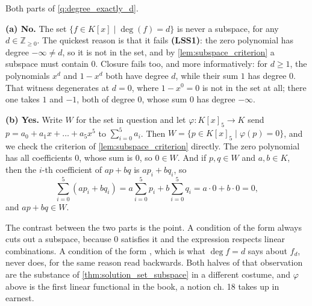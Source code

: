 \begin{answer}
Both parts of \cref{q:degree_exactly_d}.

\textbf{(a) No.} The set $\{f \in K[x] \mid \deg(f) = d\}$ is never a subspace, for any $d \in \mathbb{Z}_{\ge 0}$. The quickest reason is that it fails \textbf{(LSS1)}: the zero polynomial has degree $-\infty \neq d$, so it is not in the set, and by \cref{lem:subspace_criterion} a subspace must contain $0$. Closure fails too, and more informatively: for $d \ge 1$, the polynomials $x^d$ and $1 - x^d$ both have degree $d$, while their sum $1$ has degree $0$. That witness degenerates at $d = 0$, where $1 - x^0 = 0$ is not in the set at all; there one takes $1$ and $-1$, both of degree $0$, whose sum $0$ has degree $-\infty$.

\textbf{(b) Yes.} Write $W$ for the set in question and let $\varphi \colon K[x]_5 \to K$ send $p = a_0 + a_1 x + \dots + a_5 x^5$ to $\sum_{i=0}^{5} a_i$. Then $W = \{p \in K[x]_5 \mid \varphi(p) = 0\}$, and we check the criterion of \cref{lem:subspace_criterion} directly. The zero polynomial has all coefficients $0$, whose sum is $0$, so $0 \in W$. And if $p, q \in W$ and $a, b \in K$, then the $i$-th coefficient of $a p + b q$ is $a p_i + b q_i$, so
\[
    \sum_{i=0}^{5} (a p_i + b q_i) = a \sum_{i=0}^{5} p_i + b \sum_{i=0}^{5} q_i = a \cdot 0 + b \cdot 0 = 0,
\]
and $a p + b q \in W$.

The contrast between the two parts is the point. A condition of the form  always cuts out a subspace, because $0$ satisfies it and the expression respects linear combinations. A condition of the form , which is what $\deg f = d$ says about $f_d$, never does, for the same reason read backwards. Both halves of that observation are the substance of \cref{thm:solution_set_subspace} in a different costume, and $\varphi$ above is the first linear functional in the book, a notion ch. 18 takes up in earnest.
\end{answer}




